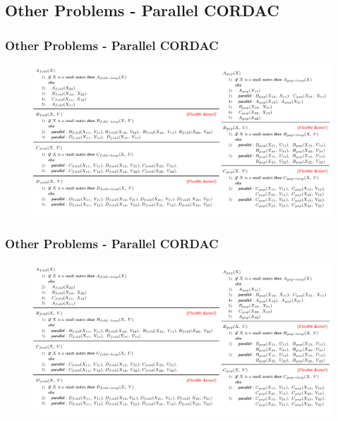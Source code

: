 \subsection{Other Problems - Parallel CORDAC}
\begin{frame}
    \frametitle{Other Problems - Parallel CORDAC}
    \begin{figure}
		\includegraphics[scale=0.2]{figure/fig-fold-gap-parallel.png}
	\end{figure}
\end{frame}

\begin{frame}
    \frametitle{Other Problems - Parallel CORDAC}
    \begin{figure}
		\includegraphics[scale=0.2]{figure/fig-fold-gap-parallel.png}
	\end{figure}
\end{frame}
